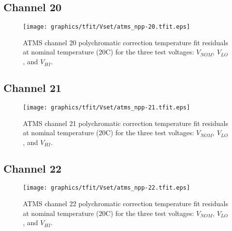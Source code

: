 \subsection{Channel 20}
\begin{figure}[H]
  \label{fig:Vset.ch20_tfit}
  \centering
  \texttt{[image: graphics/tfit/Vset/atms\_npp-20.tfit.eps]}
  \caption{ATMS channel 20 polychromatic correction temperature fit residuals at nominal temperature (20\textdegree{}C) for the three test voltages: $V_{NOM}$, $V_{LO}$, and $V_{HI}$.}
\end{figure}

\subsection{Channel 21}
\begin{figure}[H]
  \label{fig:Vset.ch21_tfit}
  \centering
  \texttt{[image: graphics/tfit/Vset/atms\_npp-21.tfit.eps]}
  \caption{ATMS channel 21 polychromatic correction temperature fit residuals at nominal temperature (20\textdegree{}C) for the three test voltages: $V_{NOM}$, $V_{LO}$, and $V_{HI}$.}
\end{figure}

\subsection{Channel 22}
\begin{figure}[H]
  \label{fig:Vset.ch22_tfit}
  \centering
  \texttt{[image: graphics/tfit/Vset/atms\_npp-22.tfit.eps]}
  \caption{ATMS channel 22 polychromatic correction temperature fit residuals at nominal temperature (20\textdegree{}C) for the three test voltages: $V_{NOM}$, $V_{LO}$, and $V_{HI}$.}
\end{figure}
